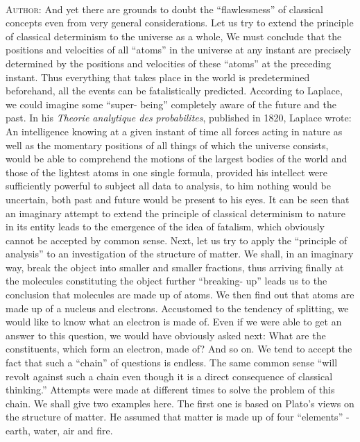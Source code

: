 \documentclass[a4paper,sfsidenotes,colorlinks=true]{tufte-book}
\numberwithin{equation}{section}
\numberwithin{figure}{section}
\begin{document}
\\
\textsc{Author:} And yet there are grounds to doubt the ``flawlessness'' of classical concepts even from very general considerations. Let us try to extend the principle of classical determinism to the universe as a whole, We must conclude that the positions and velocities of all ``atoms'' in the universe at any instant are precisely determined by the positions and velocities of these ``atoms'' at the preceding instant. Thus everything that takes place in the world is predetermined beforehand, all the events can be fatalistically predicted. According to Laplace, we could imagine some ``super- being'' completely aware of the future and the past. In his \emph{Theorie analytique des probabilites}\cite{laplace-1952}, published in 1820, Laplace wrote: An intelligence knowing at a given instant of time all forces acting in nature as well as the momentary positions of all things of which the universe consists, would be able to comprehend the motions of the largest bodies of the world and those of the lightest atoms in one single formula, provided his intellect were sufficiently powerful to subject all data to analysis, to him nothing would be uncertain, both past and future would be present to his eyes. It can be seen that an imaginary attempt to extend the principle of classical determinism to nature in its entity leads to the emergence of the idea of fatalism, which obviously cannot be accepted by common sense. Next, let us try to apply the ``principle of analysis'' to an investigation of the structure of matter. We shall, in an imaginary way, break the object into smaller and smaller fractions, thus arriving finally at the molecules constituting the object further ``breaking- up'' leads us to the conclusion that molecules are made up of atoms. We then find out that atoms are made up of a nucleus and electrons. Accustomed to the tendency of splitting, we would like to know what an electron is made of. Even if we were able to get an answer to this question, we would have obviously asked next: What are the constituents, which form an electron, made of? And so on. We tend to accept the fact that such a ``chain'' of questions is endless. The same common sense ``will revolt against such a chain even though it is a direct consequence of classical thinking.'' Attempts were made at different times to solve the problem of this chain. We shall give two examples here. The first one is based on Plato's views on the structure of matter. He assumed that matter is made up of four ``elements'' - earth, water, air and fire.
\end{document}
